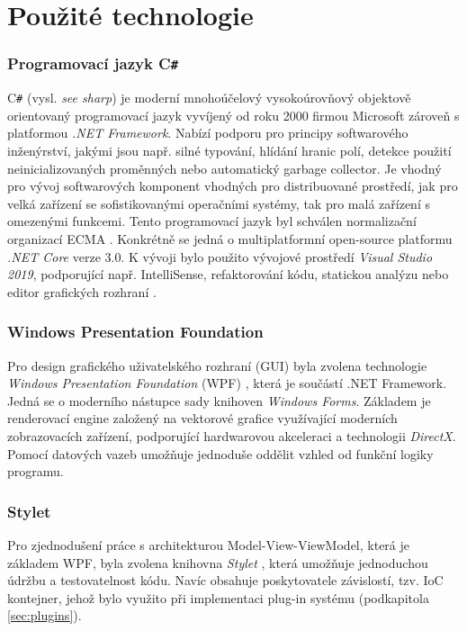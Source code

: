 \section{Použité technologie}
\subsubsection{Programovací jazyk C\texttt{\#}}
C\texttt{\#} (vysl. \emph{see sharp}) je moderní mnohoúčelový vysokoúrovňový objektově orientovaný programovací jazyk vyvíjený od roku 2000 firmou Microsoft zároveň s platformou \emph{.NET Framework}. Nabízí podporu pro principy softwarového inženýrství, jakými jsou např. silné typování, hlídání hranic polí, detekce použití neinicializovaných proměnných nebo automatický garbage collector. Je vhodný pro vývoj softwarových komponent vhodných pro distribuované prostředí, jak pro velká zařízení se sofistikovanými operačními systémy, tak pro malá zařízení s omezenými funkcemi. Tento programovací jazyk byl schválen normalizační organizací ECMA \cite{ECMA}. Konkrétně se jedná o multiplatformní open-source platformu \emph{.NET Core} verze 3.0. K vývoji bylo použito vývojové prostředí \emph{Visual Studio 2019}, podporující např. IntelliSense, refaktorování kódu, statickou analýzu nebo editor grafických rozhraní \cite{MSDOCS}.

\subsubsection{Windows Presentation Foundation}
Pro design grafického uživatelského rozhraní (GUI) byla zvolena technologie \emph{Windows Presentation Foundation} (WPF) \cite{MSDOCS}, která je součástí .NET Framework. Jedná se o moderního nástupce sady knihoven \emph{Windows Forms}. Základem je renderovací engine založený na vektorové grafice využívající moderních zobrazovacích zařízení, podporující hardwarovou akceleraci a technologii \emph{DirectX}. Pomocí datových vazeb umožňuje jednoduše oddělit vzhled od funkční logiky programu.

\subsubsection{Stylet}
Pro zjednodušení práce s architekturou Model-View-ViewModel, která je základem WPF, byla zvolena knihovna \emph{Stylet} \cite{Stylet}, která umožňuje jednoduchou údržbu a testovatelnost kódu. Navíc obsahuje poskytovatele závislostí, tzv. IoC kontejner, jehož bylo využito při implementaci plug-in systému (podkapitola \ref{sec:plugins}).

